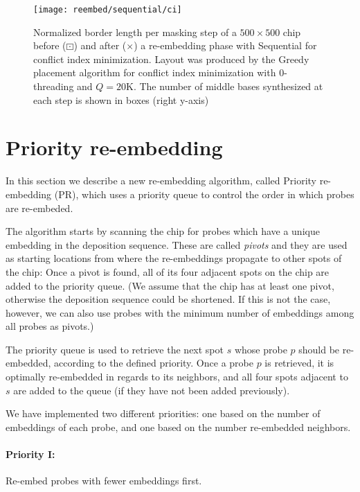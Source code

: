 \begin{figure}[t]\centering
\texttt{[image: reembed/sequential/ci]}
\caption{\label{fig:sequential-ci_blm}
  Normalized border length per masking step of a $500\times 500$ chip before
  ({\tiny $\boxdot$}) and after ({\tiny $\times$}) a re-embedding phase with
  Sequential for conflict index minimization. Layout was produced by the Greedy
  placement algorithm for conflict index minimization with $0$-threading and
  $Q=20$K. The number of middle bases synthesized at each step is shown in boxes
  (right y-axis)}
\end{figure}

\section{Priority re-embedding}
\label{sec:reembed_priority}

In this section we describe a new re-embedding algorithm, called Priority
re-embedding (PR), which uses a priority queue to control the order in which
probes are re-embeded.

The algorithm starts by scanning the chip for probes which have a unique
embedding in the deposition sequence. These are called \emph{pivots} and
they are used as starting locations from where the re-embeddings propagate to
other spots of the chip: Once a pivot is found, all of its four adjacent
spots on the chip are added to the priority queue. (We assume that the chip
has at least one pivot, otherwise the deposition sequence could be shortened. If
this is not the case, however, we can also use probes with the minimum number of
embeddings among all probes as pivots.)

The priority queue is used to retrieve the next spot $s$ whose probe $p$ should
be re-embedded, according to the defined priority. Once a probe $p$ is
retrieved, it is optimally re-embedded in regards to its neighbors, and all four
spots adjacent to $s$ are added to the queue (if they have not been added
previously).

We have implemented two different priorities: one based on the number of
embeddings of each probe, and one based on the number re-embedded neighbors.

\paragraph{Priority I:} Re-embed probes with fewer embeddings first.

